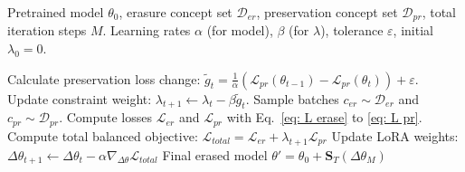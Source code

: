 \begin{algorithm}[t]
   \caption{Training Procedure of Z-Erase}
   \label{alg:z-erase}
\begin{algorithmic}
    Pretrained model $\theta_0$, erasure concept set $\mathcal{D}_{er}$, preservation concept set $\mathcal{D}_{pr}$, total iteration steps $M$.
    Learning rates $\alpha$ (for model), $\beta$ (for $\lambda$), tolerance $\varepsilon$, initial $\lambda_0 = 0$.
   
       \STATE \textbf{} Calculate preservation loss change:
       \STATE \quad $\tilde{g}_t = \frac{1}{\alpha} (\mathcal{L}_{pr}(\theta_{t-1}) - \mathcal{L}_{pr}(\theta_{t})) + \varepsilon$.
       \STATE \textbf{} Update constraint weight: $\lambda_{t+1} \leftarrow \lambda_t - \beta \tilde{g}_t$.
       \STATE \textbf{} Sample batches $c_{er} \sim \mathcal{D}_{er}$ and $c_{pr} \sim \mathcal{D}_{pr}$.
       \STATE \textbf{} Compute losses $\mathcal{L}_{er}$ and $\mathcal{L}_{pr}$ with Eq.~\ref{eq: L erase} to \ref{eq: L pr}.
       \STATE \textbf{} Compute total balanced objective:
       \STATE \quad $\mathcal{L}_{total} = \mathcal{L}_{er} + \lambda_{t+1} \mathcal{L}_{pr}$
       \STATE \textbf{} Update LoRA weights:
       \STATE \quad $\Delta \theta_{t+1} \leftarrow \Delta \theta_t - \alpha \nabla_{\Delta \theta} \mathcal{L}_{total}$
   \ENDFOR
    Final erased model $\theta' = \theta_0 + \mathbf{S}_T(\Delta \theta_M)$
\end{algorithmic}
\end{algorithm}




